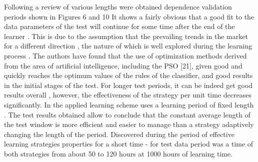 \documentclass{tewiart}
\begin{document}
Following a review of various lengths were obtained dependence validation periods shown in Figures 6 and 10 It shows a fairly obvious that a good fit to the data parameters of the test will continue for some time after the end of the learner . This is due to the assumption that the prevailing trends in the market for a different direction , the nature of which is well explored during the learning process . The authors have found that the use of optimization methods derived from the area of artificial intelligence, including the PSO [21], given good and quickly reaches the optimum values of the rules of the classifier, and good results in the initial stages of the test. For longer test periods, it can be indeed get good results overall , however, the effectiveness of the strategy per unit time decreases significantly. In the applied learning scheme uses a learning period of fixed length . The test results obtained allow to conclude that the constant average length of the test window is more efficient and easier to manage than a strategy adaptively changing the length of the period. Discovered during the period of effective learning strategies properties for a short time - for test data period was a time of both strategies from about 50 to 120 hours at 1000 hours of learning time. \\
\end{document}
